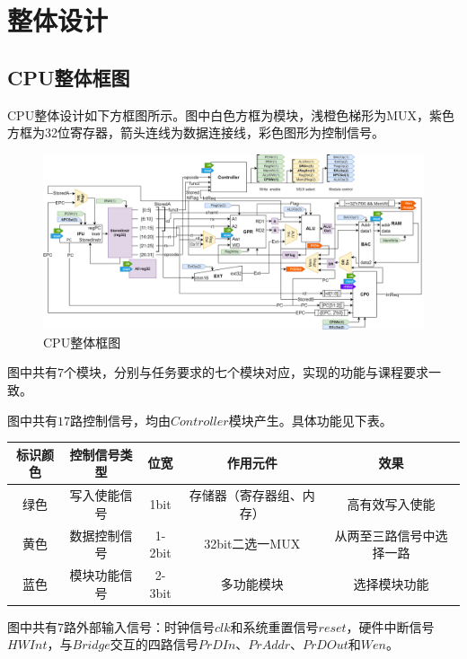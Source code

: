 \documentclass[main.tex]{subfiles}
\begin{document}
\section{整体设计}
\subsection{CPU整体框图}
CPU整体设计如下方框图所示。图中白色方框为模块，浅橙色梯形为MUX，紫色方框为32位寄存器，箭头连线为数据连接线，彩色图形为控制信号。
\begin{figure}[h]
\centering
\includegraphics[width=\textwidth]{images/PCOCD-P3-mips-block.png}
\caption{CPU整体框图}
\end{figure}

图中共有$7$个模块，分别与任务要求的七个模块对应，实现的功能与课程要求一致。

图中共有$17$路控制信号，均由$Controller$模块产生。具体功能见下表。

\begin{center}
    \begin{tabular}{c c c c c}
        \toprule
        标识颜色 & 控制信号类型 & 位宽 & 作用元件 & 效果\\
        \midrule
         绿色 & 写入使能信号 & 1bit & 存储器（寄存器组、内存） & 高有效写入使能 \\
         黄色 & 数据控制信号 & 1-2bit & 32bit二选一MUX & 从两至三路信号中选择一路 \\
         蓝色 & 模块功能信号 & 2-3bit & 多功能模块 & 选择模块功能 \\
        \bottomrule
    \end{tabular}
\end{center}

图中共有$7$路外部输入信号：时钟信号$clk$和系统重置信号$reset$，硬件中断信号$HWInt$，与$Bridge$交互的四路信号$PrDIn$、$PrAddr$、$PrDOut$和$Wen$。

\clearpage
\end{document}
